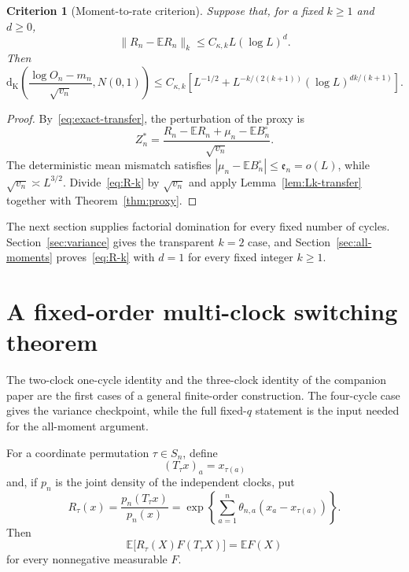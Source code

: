 \documentclass[11pt]{article}
\newtheorem{criterion}[theorem]{Criterion}
\theoremstyle{remark}
\newcommand{\Ee}{\mathbb E}
\newcommand{\Kol}{\mathrm d_{\mathrm K}}
\begin{document}
\begin{criterion}[Moment-to-rate criterion]
\label{crit:moment-rate}
Suppose that, for a fixed $k\ge1$ and $d\ge0$,
\begin{equation}
\label{eq:R-k}
 \|R_n-\Ee R_n\|_k
 \le C_{\kappa,k}L(\log L)^d.
\end{equation}
Then
\begin{equation}
\label{eq:rate-k}
 \Kol\!\left(
 \frac{\log O_n-m_n}{\sqrt{v_n}},N(0,1)\right)
 \le C_{\kappa,k}
 \left[
 L^{-1/2}
 +L^{-k/(2(k+1))}(\log L)^{dk/(k+1)}
 \right].
\end{equation}
\end{criterion}

\begin{proof}
By~\eqref{eq:exact-transfer}, the perturbation of the proxy is
\[
 Z_n^*=\frac{R_n-\Ee R_n+\mu_n-\Ee B_n^\circ}{\sqrt{v_n}}.
\]
The deterministic mean mismatch satisfies
$|\mu_n-\Ee B_n^\circ|\le\mathfrak e_n=o(L)$, while
$\sqrt{v_n}\asymp L^{3/2}$.  Divide~\eqref{eq:R-k} by $\sqrt{v_n}$ and
apply Lemma~\ref{lem:Lk-transfer} together with
Theorem~\ref{thm:proxy}.
\end{proof}

The next section supplies factorial domination for every fixed number of
cycles.  Section~\ref{sec:variance} gives the transparent $k=2$ case, and
Section~\ref{sec:all-moments} proves~\eqref{eq:R-k} with $d=1$ for every
fixed integer $k\ge1$.

\section{A fixed-order multi-clock switching theorem}
\label{sec:multiclock}

The two-clock one-cycle identity and the three-clock identity of the
companion paper are the first cases of a general finite-order construction.
The four-cycle case gives the variance checkpoint, while the full fixed-$q$
statement is the input needed for the all-moment argument.

For a coordinate permutation $\tau\in S_n$, define
\[
 (T_\tau x)_a=x_{\tau(a)}
\]
and, if $p_n$ is the joint density of the independent clocks, put
\begin{equation}
\label{eq:Rtau-general}
 R_\tau(x)=\frac{p_n(T_\tau x)}{p_n(x)}
 =\exp\left\{\sum_{a=1}^n
 \theta_{n,a}(x_a-x_{\tau(a)})\right\}.
\end{equation}
Then
\begin{equation}
\label{eq:tau-cov-general}
 \Ee\bigl[R_\tau(X)F(T_\tau X)\bigr]=\Ee F(X)
\end{equation}
for every nonnegative measurable $F$.
\end{document}
